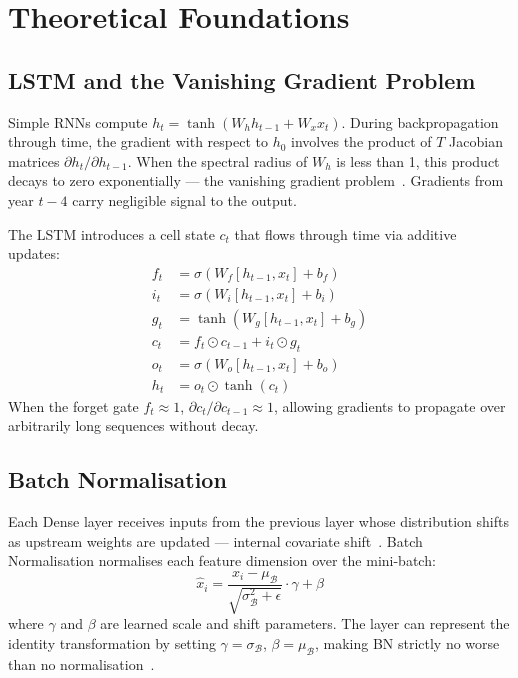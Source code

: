 \documentclass[conference]{IEEEtran}
\begin{document}
\section{Theoretical Foundations}
\label{sec:theory}

\subsection{LSTM and the Vanishing Gradient Problem}
Simple RNNs compute $h_t = \tanh(W_h h_{t-1} + W_x x_t)$.
During backpropagation through time, the gradient with respect to $h_0$ involves
the product of $T$ Jacobian matrices $\partial h_t / \partial h_{t-1}$.
When the spectral radius of $W_h$ is less than 1, this product decays to zero
exponentially — the vanishing gradient problem~\cite{hochreiter1997}.
Gradients from year $t{-}4$ carry negligible signal to the output.

The LSTM introduces a cell state $c_t$ that flows through time via additive updates:
\begin{align}
    f_t &= \sigma(W_f [h_{t-1}, x_t] + b_f) \\
    i_t &= \sigma(W_i [h_{t-1}, x_t] + b_i) \\
    g_t &= \tanh(W_g [h_{t-1}, x_t] + b_g) \\
    c_t &= f_t \odot c_{t-1} + i_t \odot g_t \\
    o_t &= \sigma(W_o [h_{t-1}, x_t] + b_o) \\
    h_t &= o_t \odot \tanh(c_t)
\end{align}
When the forget gate $f_t \approx 1$, $\partial c_t / \partial c_{t-1} \approx 1$,
allowing gradients to propagate over arbitrarily long sequences without decay.

\subsection{Batch Normalisation}
Each Dense layer receives inputs from the previous layer whose distribution shifts
as upstream weights are updated — internal covariate shift~\cite{ioffe2015}.
Batch Normalisation normalises each feature dimension over the mini-batch:
\begin{equation}
    \hat{x}_i = \frac{x_i - \mu_\mathcal{B}}{\sqrt{\sigma_\mathcal{B}^2 + \epsilon}}
    \cdot \gamma + \beta
\end{equation}
where $\gamma$ and $\beta$ are learned scale and shift parameters.
The layer can represent the identity transformation by setting
$\gamma = \sigma_\mathcal{B}$, $\beta = \mu_\mathcal{B}$,
making BN strictly no worse than no normalisation~\cite{ioffe2015}.
\end{document}
